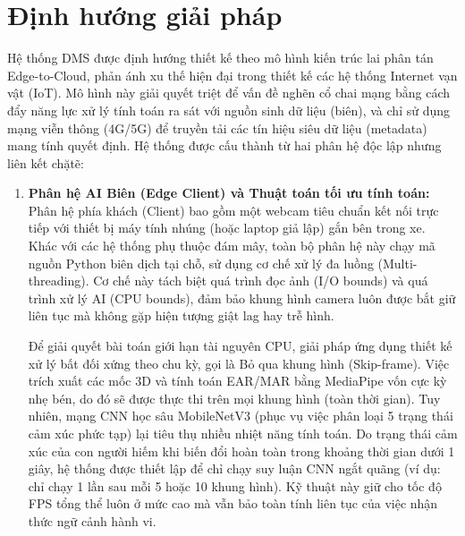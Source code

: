 \documentclass[../DoAn.tex]{subfiles}
\begin{document}
\section{Định hướng giải pháp}
\label{section:1.4}
Hệ thống DMS được định hướng thiết kế theo mô hình kiến trúc lai phân tán Edge-to-Cloud, phản ánh xu thế hiện đại trong thiết kế các hệ thống Internet vạn vật (IoT). Mô hình này giải quyết triệt để vấn đề nghẽn cổ chai mạng bằng cách đẩy năng lực xử lý tính toán ra sát với nguồn sinh dữ liệu (biên), và chỉ sử dụng mạng viễn thông (4G/5G) để truyền tải các tín hiệu siêu dữ liệu (metadata) mang tính quyết định. Hệ thống được cấu thành từ hai phân hệ độc lập nhưng liên kết chặtẽ:
\begin{enumerate}
    \item \textbf{Phân hệ AI Biên (Edge Client) và Thuật toán tối ưu tính toán:}\\
    Phân hệ phía khách (Client) bao gồm một webcam tiêu chuẩn kết nối trực tiếp với thiết bị máy tính nhúng (hoặc laptop giả lập) gắn bên trong xe. Khác với các hệ thống phụ thuộc đám mây, toàn bộ phân hệ này chạy mã nguồn Python biên dịch tại chỗ, sử dụng cơ chế xử lý đa luồng (Multi-threading). Cơ chế này tách biệt quá trình đọc ảnh (I/O bounds) và quá trình xử lý AI (CPU bounds), đảm bảo khung hình camera luôn được bắt giữ liên tục mà không gặp hiện tượng giật lag hay trễ hình.
    
    Để giải quyết bài toán giới hạn tài nguyên CPU, giải pháp ứng dụng thiết kế xử lý bất đối xứng theo chu kỳ, gọi là Bỏ qua khung hình (Skip-frame). Việc trích xuất các mốc 3D và tính toán EAR/MAR bằng MediaPipe vốn cực kỳ nhẹ bén, do đó sẽ được thực thi trên mọi khung hình (toàn thời gian). Tuy nhiên, mạng CNN học sâu MobileNetV3 (phục vụ việc phân loại 5 trạng thái cảm xúc phức tạp) lại tiêu thụ nhiều nhiệt năng tính toán. Do trạng thái cảm xúc của con người hiếm khi biến đổi hoàn toàn trong khoảng thời gian dưới 1 giây, hệ thống được thiết lập để chỉ chạy suy luận CNN ngắt quãng (ví dụ: chỉ chạy 1 lần sau mỗi 5 hoặc 10 khung hình). Kỹ thuật này giữ cho tốc độ FPS tổng thể luôn ở mức cao mà vẫn bảo toàn tính liên tục của việc nhận thức ngữ cảnh hành vi.
    

\end{enumerate}
\end{document}
